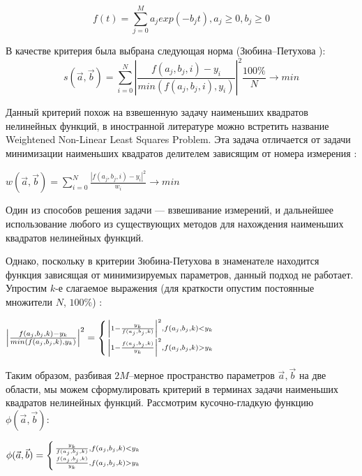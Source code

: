 \begin{equation}
  \label{eq:approximation}
  \mathit{ f(t)  = \displaystyle\sum_{j=0}^M a_j exp(-b_j t) , a_j \geq 0 , b_j \geq 0  }  
\end{equation}




В качестве критерия была выбрана следующая норма (Зюбина--Петухова ): 
\begin{equation}
	\label{eq:zuybin_petuhov}
	s(\vec{a}, \vec{b}) = \displaystyle\sum_{i=0}^N \left|
	\frac{f(a_j, b_j, i) - y_i}{min(f(a_j, b_j, i), y_i)}\right|^2 
	\frac{100\%}{N} \rightarrow min %
\end{equation}

Данный критерий похож на взвешенную задачу наименьших квадратов 
нелинейных функций, в иностранной литературе можно встретить название 
Weightened Non-Linear Least Squares Problem. Эта задача отличается
от задачи минимизации наименьших квадратов делителем зависящим от номера измерения : 
\begin{center}
$w(\vec{a}, \vec{b}) = \displaystyle\sum_{i=0}^N \frac{\left|f(a_j, b_j, i) - y_i\right|^2}{w_i} \rightarrow min$
\end{center}
Один из способов решения задачи --- взвешивание измерений, и  дальнейшее использование любого из существующих методов для нахождения 
наименьших квадратов нелинейных функций.


Однако, поскольку в критерии Зюбина-Петухова в знаменателе 
находится функция зависящая от минимизируемых параметров, 
данный подход не работает. Упростим $k$-е слагаемое выражения %
(для краткости опустим постоянные множители $N$, $100\%$) : 

\begin{center}
 \large{$ \left|\frac{f(a_j, b_j, k) - y_k}{min(f(a_j, b_j, k), y_k)}\right|^2 = \left\{ {
    \left| 1 - \frac{y_k}{f(a_j, b_j, k)}\right|^2 , f(a_j, b_j, k) < y_k  \atop 
    \left| 1 - \frac{f(a_j, b_j, k)}{y_k}\right|^2 , f(a_j, b_j, k) > y_k  
 } \right. $}
\end{center}

Таким образом, разбивая $ 2 M $--мерное пространство параметров $ \vec{a}, \vec{b}$ на две области, мы можем сформулировать критерий в терминах задачи наименьших квадратов нелинейных функций.
Рассмотрим кусочно-гладкую функцию $\phi(\vec{a}, \vec{b})$: 
\begin{center}
$ \phi(\vec{a}, \vec{b}) = \left\{ {
    \frac{y_k}{f(a_j, b_j, k)} , f(a_j, b_j, k) < y_k  \atop 
    \frac{f(a_j, b_j, k)}{y_k} , f(a_j, b_j, k) > y_k  
 } \right.$
\end{center}

